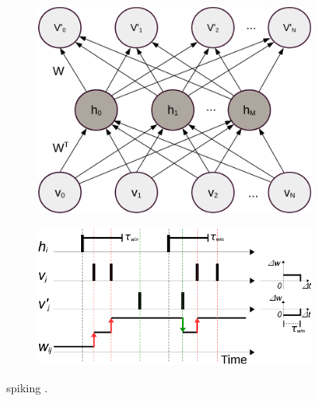 \begin{figure}[th]
	\centering
	\DIFdelbeginFL %
\DIFdelendFL \DIFaddbeginFL \begin{subfigure}[t]{0.35\textwidth}
		\includegraphics[width=\textwidth]{pics_sdlm/AE.pdf}
	\end{subfigure}
	\begin{subfigure}[t]{0.6\textwidth}
		\includegraphics[width=\textwidth]{pics_sdlm/rSTDP.pdf}
	\end{subfigure}
	\DIFaddendFL \caption{\DIFdelbeginFL {}\DIFdelendFL \DIFaddbeginFL {}\DIFaddendFL spiking \DIFdelbeginFL {}\DIFdelendFL \DIFaddbeginFL {}\DIFaddendFL .}
	\label{fig:rSTDP}
\end{figure}

